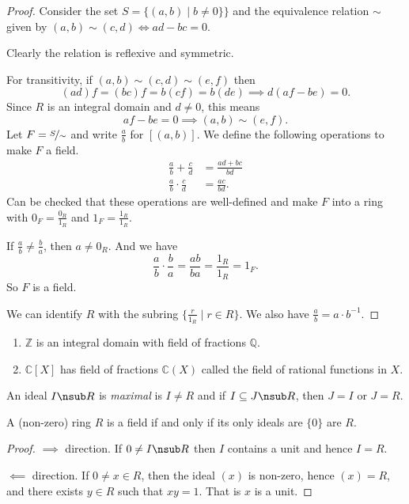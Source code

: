 \begin{proof}
    Consider the set \(S = \{(a,b)\mid b \neq 0\}\}\) and the equivalence relation \(\sim\) given by \((a,b) \sim (c,d) \iff ad - bc = 0\).

    Clearly the relation is reflexive and symmetric.
    
    For transitivity, if \((a,b)\sim (c,d)\sim (e,f)\) then
    \[
        (ad)f = (bc)f = b(cf) = b(de) \implies d(af-be) = 0.
    \]
    Since \(R\) is an integral domain and \(d\neq 0\), this means
    \[af - be = 0 \implies (a,b) \sim (e,f).\]
    Let \(F = \nicefrac{S}{\sim}\) and write \(\frac{a}{b}\) for \([(a,b)]\). We define the following operations to make \(F\) a field.
    \begin{align*}
        \frac{a}{b} + \frac{c}{d} &= \frac{ad + bc}{bd}\\
        \frac{a}{b}\cdot \frac{c}{d} &= \frac{ac}{bd}.
    \end{align*}
    Can be checked that these operations are well-defined and make \(F\) into a ring with \(0_F = \frac{0_R}{1_R}\) and \(1_F = \frac{1_R}{1_R}\).

    If \(\frac{a}{b} \neq \frac{b}{a}\), then \(a \neq 0_R\). And we have
    \[
        \frac{a}{b}\cdot \frac{b}{a} = \frac{ab}{ba}=\frac{1_R}{1_R} = 1_F.
    \]
    So \(F\) is a field.

    We can identify \(R\) with the subring \(\{\frac{r}{1_R}\mid r \in R\}\). We also have \(\frac{a}{b} = a\cdot b^{-1}\).
\end{proof}
\begin{example}
    \leavevmode
    \begin{enumerate}
        \item \(\mathbb{Z}\) is an integral domain with field of fractions \(\mathbb{Q}\).
        \item \(\mathbb{C}[X]\) has field of fractions \(\mathbb{C}(X)\) called the field of rational functions in \(X\).
    \end{enumerate}
\end{example}
\begin{definition}{}{}
    An ideal \(I \nsub R\) is \textit{maximal} is \(I \neq R\) and if \(I \subseteq J \nsub R\), then \(J = I\) or \(J = R\).
\end{definition}
\begin{lemma}{}{}
    A (non-zero) ring \(R\) is a field if and only if its only ideals are \(\{0\}\) are \(R\).
\end{lemma}
\begin{proof}
    \(\implies\) direction. If \(0 \neq I \nsub R \) then \(I\) contains a unit and hence \(I = R\).

    \(\impliedby\) direction. If \( 0 \neq  x\in R\), then the ideal \((x)\) is non-zero, hence \((x) = R\), and there exists \(y \in R\) such that \(xy = 1\). That is \(x\) is a unit.
\end{proof}
